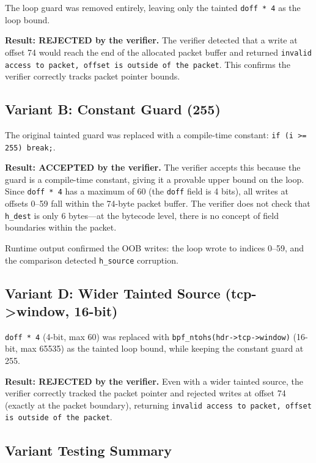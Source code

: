 \noindent
The loop guard was removed entirely, leaving only the tainted \texttt{doff * 4} as the loop bound.

\noindent
\textbf{Result: REJECTED by the verifier.} The verifier detected that a write at offset 74 would reach the end of the allocated packet buffer and returned \texttt{invalid access to packet, offset is outside of the packet}. This confirms the verifier correctly tracks packet pointer bounds.

\subsection{Variant B: Constant Guard (255)}

\noindent
The original tainted guard was replaced with a compile-time constant: \texttt{if (i >= 255) break;}.

\noindent
\textbf{Result: ACCEPTED by the verifier.} The verifier accepts this because the guard is a compile-time constant, giving it a provable upper bound on the loop. Since \texttt{doff * 4} has a maximum of 60 (the \texttt{doff} field is 4 bits), all writes at offsets 0--59 fall within the 74-byte packet buffer. The verifier does not check that \texttt{h\_dest} is only 6 bytes---at the bytecode level, there is no concept of field boundaries within the packet.

\noindent
Runtime output confirmed the OOB writes: the loop wrote to indices 0--59, and the comparison detected \texttt{h\_source} corruption.

\subsection{Variant D: Wider Tainted Source (tcp->window, 16-bit)}

\noindent
\texttt{doff * 4} (4-bit, max 60) was replaced with \texttt{bpf\_ntohs(hdr->tcp->window)} (16-bit, max 65535) as the tainted loop bound, while keeping the constant guard at 255.

\noindent
\textbf{Result: REJECTED by the verifier.} Even with a wider tainted source, the verifier correctly tracked the packet pointer and rejected writes at offset 74 (exactly at the packet boundary), returning \texttt{invalid access to packet, offset is outside of the packet}.

\subsection{Variant Testing Summary}

